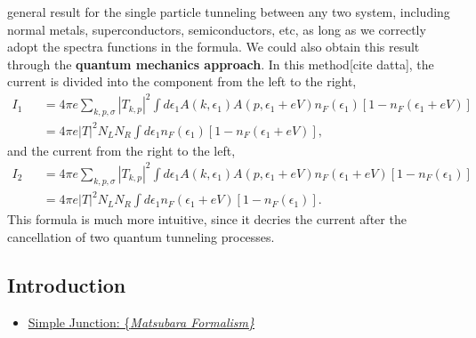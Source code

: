 \documentclass[11pt]{article}
\providecommand{\tightlist}{%
      \setlength{\itemsep}{0pt}\setlength{\parskip}{0pt}}
\begin{document}
general result for the single particle tunneling between any two system,
including normal metals, superconductors, semiconductors, etc, as long
as we correctly adopt the spectra functions in the formula. We could
also obtain this result through the \textbf{quantum mechanics approach}.
In this method{[}cite datta{]}, the current is divided into the
component from the left to the right, \begin{eqnarray}
I_1 && = 4\pi e \sum_{k,p,\sigma}  |T_{k,p}|^2   \int d\epsilon_1 A(k,\epsilon_1 ) A(p,\epsilon_1+ eV ) n_F (\epsilon_1) \left[ 1- n_F(\epsilon_1 + eV) \right]
\nonumber \\ 
&& =  4\pi e  |T|^2  N_L N_R  \int d\epsilon_1 n_F (\epsilon_1) \left[ 1- n_F(\epsilon_1 + eV) \right],
\end{eqnarray} and the current from the right to the left,
\begin{eqnarray}
I_2 && =4\pi  e \sum_{k,p,\sigma}  |T_{k,p}|^2   \int d\epsilon_1 A(k,\epsilon_1 ) A(p,\epsilon_1+ eV ) n_F (\epsilon_1+eV) \left[ 1- n_F(\epsilon_1 ) \right]
\nonumber \\ 
&& =  4\pi e  |T|^2  N_L N_R  \int d\epsilon_1 n_F (\epsilon_1+eV) \left[ 1- n_F(\epsilon_1) \right].
\end{eqnarray} This formula is much more intuitive, since it decries the
current after the cancellation of two quantum tunneling processes.

    \hypertarget{introduction}{%
\subsection{Introduction}\label{introduction}}

\begin{itemize}
\tightlist
\item
  \href{http://ucidatascienceinitiative.github.io/IntroToJulia/Html/simplejunction}{Simple
  Junction: \{\it Matsubara Formalism\}}
\end{itemize}


    
    
    
    
\end{document}
